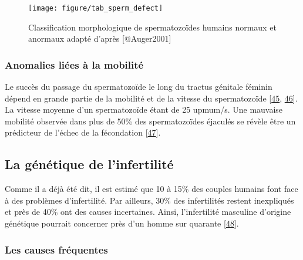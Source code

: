 \documentclass[12pt,twoside]{ugathesis}
\theoremstyle{definition}
\theoremstyle{definition}
\theoremstyle{remark}
\begin{document}
\newpage  

\begin{figure}

{\centering \texttt{[image: figure/tab\_sperm\_defect]} 

}

\caption[Classification morphologique de spermatozoïdes humains normaux et anormaux adapté]{Classification morphologique de spermatozoïdes humains normaux et anormaux adapté d'après [@Auger2001]}\label{fig:anomaliemorphosperm}
\end{figure}

\newpage

\subsubsection{Anomalies liées à la
mobilité}\label{anomalies-liees-a-la-mobilite}

Le succès du passage du spermatozoïde le long du tractus génitale
féminin dépend en grande partie de la mobilité et de la vitesse du
spermatozoïde {[}\protect\hyperlink{ref-Lindholmer1974}{45},
\protect\hyperlink{ref-Bjorndahl2010}{46}{]}. La vitesse moyenne d'un
spermatozoïde étant de 25 upmum/s. Une mauvaise mobilité observée dans
plus de 50\% des spermatozoïdes éjaculés se révèle être un prédicteur de
l'échec de la fécondation {[}\protect\hyperlink{ref-Aitken1985}{47}{]}.

\subsection{La génétique de
l'infertilité}\label{la-genetique-de-linfertilite}

Comme il a déjà été dit, il est estimé que 10 à 15\% des couples humains
font face à des problèmes d'infertilité. Par ailleurs, 30\% des
infertilités restent inexpliqués et près de 40\% ont des causes
incertaines. Ainsi, l'infertilité masculine d'origine génétique pourrait
concerner près d'un homme sur quarante
{[}\protect\hyperlink{ref-Tuttelmann2011}{48}{]}.

\subsubsection{Les causes fréquentes}\label{les-causes-frequentes}
\end{document}
